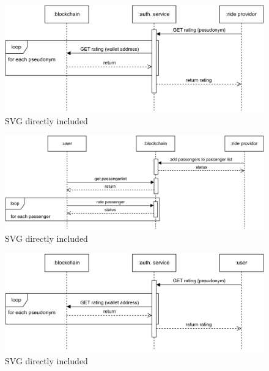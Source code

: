 \begin{figure}
    \centering
    \includegraphics[width=\linewidth]{data/7.svg}
    \caption{SVG directly included}
    \label{fig:directSVG}
\end{figure}







\begin{figure}
    \centering
    \includegraphics[width=\linewidth]{data/8.svg}
    \caption{SVG directly included}
    \label{fig:directSVG}
\end{figure}


\begin{figure}
    \centering
    \includegraphics[width=\linewidth]{data/9.svg}
    \caption{SVG directly included}
    \label{fig:directSVG}
\end{figure}
